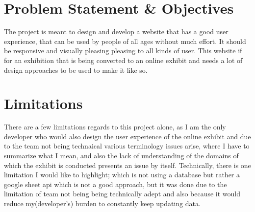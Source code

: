 \section{Problem Statement \& Objectives}
The project is meant to design and develop a website that has a good user experience, that can be used by people of all ages without much effort. It should be responsive and visually pleasing pleasing to all kinds of user. 
This website if for an exhibition that is being converted to an online exhibit and needs a lot of design approaches to be used to make it like so.

\section{Limitations}

There are a few limitations regards to this project alone, as I am the only developer who would also design the user experience of the online exhibit and due to the team not being technaical various terminology issues arise, where I have to summarize what I mean, and also the lack of understanding of the domains of which the exhibit is conducted presents an issue by itself. Technically, there is one limitation I would like to highlight; which is not using a database but rather a google sheet api which is not a good approach, but it was done due to the limitation of team not being being technically adept and also because it would reduce my(developer's) burden to constantly keep updating data. 
